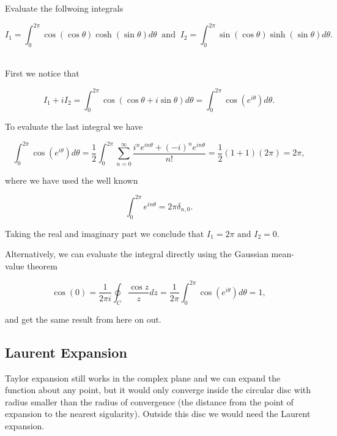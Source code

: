 \documentclass[english,a4paper,12pt]{report}
\begin{document}
{Evaluate the follwoing integrals

\begin{equation}
    I_1 = \int_{0}^{2\pi } \cos (\cos \theta ) \cosh (\sin \theta ) d \theta ~\text { and }~ I_2 = \int_{0}^{2\pi } \sin (\cos \theta ) \sinh (\sin \theta ) d \theta .   
\end{equation}
~
}
{First we notice that 

\begin{equation}
    I_1 + iI_2 = \int_{0}^{2\pi } \cos (\cos \theta + i \sin \theta ) d \theta = \int_{0}^{2\pi } \cos (e^{i \theta } ) d \theta .    
\end{equation}

To evaluate the last integral we have 

\begin{equation}
    \int_{0}^{2\pi } \cos (e^{i \theta } ) d \theta = \frac{1}{2} \int_{0}^{2\pi } \sum_{n=0}^{\infty} \frac{i ^{n} e^{i n \theta } + (-i)^{n} e^{i n \theta }}{n!} = \frac{1}{2} (1+1) (2\pi ) = 2\pi ,     
\end{equation}

where we have used the well known 

\begin{equation}
    \int_{0}^{2\pi } e^{in \theta } = 2\pi \delta _{n,0}.   
\end{equation}

Taking the real and imaginary part we conclude that \(I_1 = 2\pi \text { and } I_2 = 0\).

Alternatively, we can evaluate the integral directly using the Gaussian mean-value theorem

\begin{equation}
    \cos (0) = \frac{1}{2\pi i} \oint_{C} \frac{\cos z}{z}dz = \frac{1}{2\pi } \int_{0}^{2\pi } \cos (e^{i \theta } ) d \theta = 1,
\end{equation}

and get the same result from here on out.
} 



\subsection{Laurent Expansion}

Taylor expansion still works in the complex plane and we can expand the function about any point, but it would only converge inside the circular disc with radius smaller than the radius of convergence (the distance from the point of expansion to the nearest sigularity). Outside this disc we would need the Laurent expansion.
\end{document}
